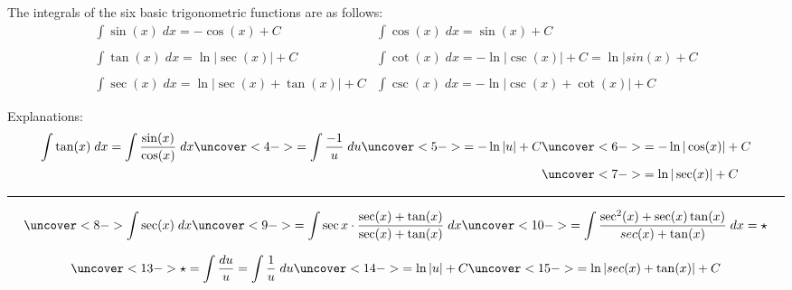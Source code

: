 \begin{frame}
%
\begin{example}
The integrals of the six basic trigonometric functions are as follows:
\[
\begin{array}{ll}
\int \sin(x) \; dx = -\cos(x)+C & \int \cos(x) \; dx = \sin(x)+C  \\ 
&\\
 \int \tan(x) \; dx = \ln|\sec(x)|+C & \int \cot(x) \; dx = -\ln|\csc(x)|+C = \ln|sin(x)+C   \\ 
 &\\
 \int \sec(x) \; dx = \ln|\sec(x)+\tan(x)|+C & \int \csc(x) \; dx = -\ln|\csc(x)+\cot(x)|+C  
\end{array} 
\]
\end{example}
\end{frame}
\begin{frame}
Explanations:\\
\begin{align*}
\int \tan(x)\; dx = \int \frac{\sin(x)}{\cos(x)}\; dx \uncover<4->{ =\int\frac{-1}{u}\; du} \uncover<5->{= -\ln|u|+C}& \uncover<6->{= -\ln|\cos(x)|+C}\\  
&\uncover<7->{= \ln|\sec(x)|+C}\\
\end{align*}

\vspace*{-9mm} {} %

\vspace*{3mm}

\rule{\textwidth}{2pt}
\[
\uncover<8->{\int \sec(x)\; dx} %
\uncover<9->{= \int \sec{x}\cdot \frac{\sec(x)+\tan(x)}{\sec(x)+\tan(x)}\; dx} %
\uncover<10->{= \int \frac{\sec^2(x) +\sec(x)\tan(x)}{sec(x)+\tan(x)}\; dx =\star }%
\]
\vspace*{-3mm} 

{}

\vspace*{2mm} 
\[
\uncover<13->{\star =\int \frac{du}{u} =\int \frac{1}{u} \; du} %
\uncover<14->{=\ln|u|+C }
\uncover<15->{=\ln|sec(x)+\tan(x)|+C}    
\]

\end{frame}
